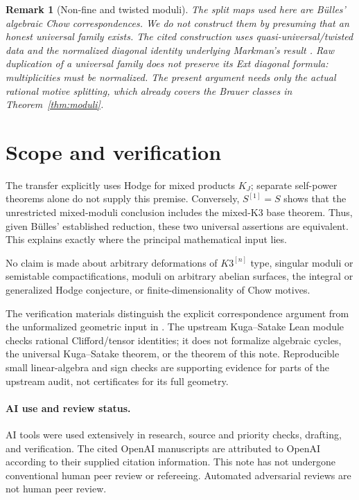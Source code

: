\documentclass[11pt]{article}
\newtheorem{remark}[theorem]{Remark}
\begin{document}
\begin{remark}[Non-fine and twisted moduli]
The split maps used here are B\"ulles' algebraic Chow correspondences.
We do not construct them by presuming that an honest universal family
exists. The cited construction uses quasi-universal/twisted data and the
normalized diagonal identity underlying Markman's result
\cite[Section~3]{Markman}. Raw duplication of a universal family does
not preserve its Ext diagonal formula: multiplicities must be normalized.
The present argument needs only the actual rational motive splitting,
which already covers the Brauer classes in Theorem~\ref{thm:moduli}.
\end{remark}

\section{Scope and verification}
The transfer explicitly uses Hodge for mixed products $K_J$; separate
self-power theorems alone do not supply this premise. Conversely,
$S^{[1]}=S$ shows that the unrestricted mixed-moduli conclusion includes
the mixed-K3 base theorem. Thus, given B\"ulles' established reduction,
these two universal assertions are equivalent. This explains exactly
where the principal mathematical input lies.

No claim is made about arbitrary deformations of $K3^{[n]}$ type,
singular moduli or semistable compactifications, moduli on arbitrary
abelian surfaces, the integral or generalized Hodge conjecture, or
finite-dimensionality of Chow motives.

The verification materials distinguish the explicit correspondence
argument from the unformalized geometric input in \cite{OpenAIMixed}.
The upstream Kuga--Satake Lean module checks rational Clifford/tensor
identities; it does not formalize algebraic cycles, the universal
Kuga--Satake theorem, or the theorem of this note. Reproducible small
linear-algebra and sign checks are supporting evidence for parts of the
upstream audit, not certificates for its full geometry.

\paragraph{AI use and review status.}
AI tools were used extensively in research, source and priority checks,
drafting, and verification. The cited OpenAI manuscripts are attributed
to OpenAI according to their supplied citation information. This note has
not undergone conventional human peer review or refereeing. Automated
adversarial reviews are not human peer review.
\end{document}
